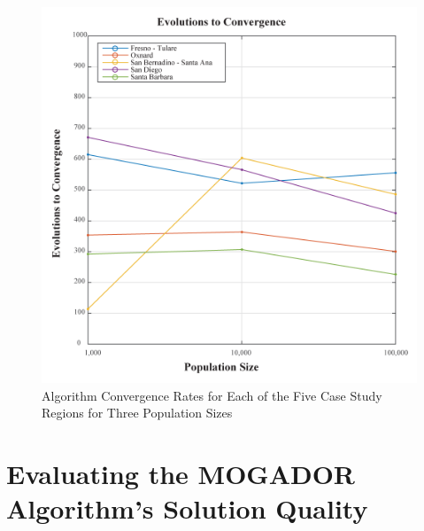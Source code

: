     \begin{figure}[!h]
        \begin{center}
        \includegraphics[width=5.5in]{figures/Evolutions.png}
        \caption{Algorithm Convergence Rates for Each of the Five Case Study Regions for Three Population Sizes}
        \label{fig:Evolutions}
        \end{center}
    \end{figure}

\section{Evaluating the MOGADOR Algorithm's Solution Quality}

